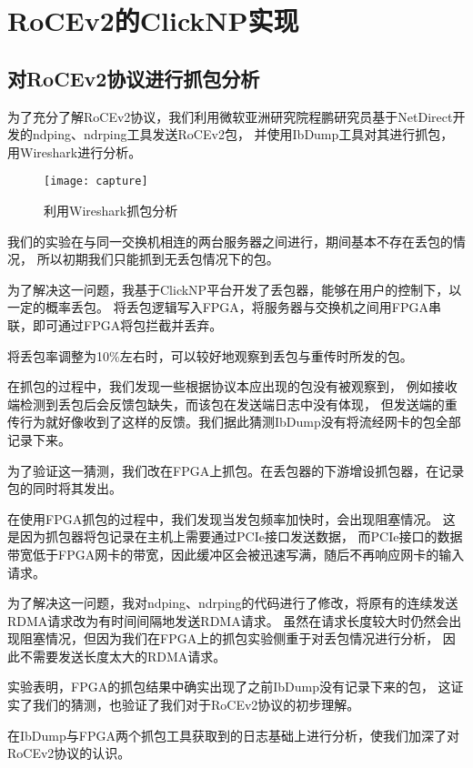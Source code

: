 \chapter{RoCEv2的ClickNP实现}
\section{对RoCEv2协议进行抓包分析}
为了充分了解RoCEv2协议，我们利用微软亚洲研究院程鹏研究员基于NetDirect开发的ndping、ndrping工具发送RoCEv2包，
并使用IbDump工具对其进行抓包，用Wireshark进行分析。
\begin{figure}[htbp]
\centering
\texttt{[image: capture]}
\caption{利用Wireshark抓包分析} \label{fig:capture}
\end{figure}



我们的实验在与同一交换机相连的两台服务器之间进行，期间基本不存在丢包的情况，
所以初期我们只能抓到无丢包情况下的包。

为了解决这一问题，我基于ClickNP平台开发了丢包器，能够在用户的控制下，以一定的概率丢包。
将丢包逻辑写入FPGA，将服务器与交换机之间用FPGA串联，即可通过FPGA将包拦截并丢弃。

将丢包率调整为10\%左右时，可以较好地观察到丢包与重传时所发的包。

在抓包的过程中，我们发现一些根据协议本应出现的包没有被观察到，
例如接收端检测到丢包后会反馈包缺失，而该包在发送端日志中没有体现，
但发送端的重传行为就好像收到了这样的反馈。我们据此猜测IbDump没有将流经网卡的包全部记录下来。

为了验证这一猜测，我们改在FPGA上抓包。在丢包器的下游增设抓包器，在记录包的同时将其发出。

在使用FPGA抓包的过程中，我们发现当发包频率加快时，会出现阻塞情况。
这是因为抓包器将包记录在主机上需要通过PCIe接口发送数据，
而PCIe接口的数据带宽低于FPGA网卡的带宽，因此缓冲区会被迅速写满，随后不再响应网卡的输入请求。

为了解决这一问题，我对ndping、ndrping的代码进行了修改，将原有的连续发送RDMA请求改为有时间间隔地发送RDMA请求。
虽然在请求长度较大时仍然会出现阻塞情况，但因为我们在FPGA上的抓包实验侧重于对丢包情况进行分析，
因此不需要发送长度太大的RDMA请求。

实验表明，FPGA的抓包结果中确实出现了之前IbDump没有记录下来的包，
这证实了我们的猜测，也验证了我们对于RoCEv2协议的初步理解。

在IbDump与FPGA两个抓包工具获取到的日志基础上进行分析，使我们加深了对RoCEv2协议的认识。

